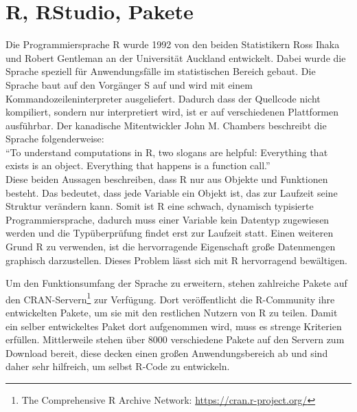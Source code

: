 \section{R, RStudio, Pakete}
\label{sec:R}
Die Programmiersprache R wurde 1992 von den beiden Statistikern  Ross Ihaka und Robert Gentleman an der Universität Auckland entwickelt. Dabei wurde die Sprache speziell für Anwendungsfälle im statistischen Bereich gebaut. Die Sprache baut auf den Vorgänger S auf und wird mit einem Kommandozeileninterpreter ausgeliefert. Dadurch dass der Quellcode nicht kompiliert, sondern nur interpretiert wird, ist er auf verschiedenen Plattformen ausführbar. Der kanadische Mitentwickler John M. Chambers beschreibt die Sprache folgenderweise:\\
\enquote{To understand computations in R, two slogans are helpful: Everything that exists is an object. Everything that happens is a function call.} \cite{chambers2014object}\\
Diese beiden Aussagen beschreiben, dass R nur aus Objekte und Funktionen besteht. Das bedeutet, dass jede Variable ein Objekt ist, das zur Laufzeit seine Struktur verändern kann. Somit ist R eine schwach, dynamisch typisierte Programmiersprache, dadurch muss einer Variable kein Datentyp zugewiesen werden und die Typüberprüfung findet erst zur Laufzeit statt. Einen weiteren Grund R zu verwenden, ist die hervorragende Eigenschaft große Datenmengen graphisch darzustellen. Dieses Problem lässt sich mit R hervorragend bewältigen.

Um den Funktionsumfang der Sprache zu erweitern, stehen zahlreiche Pakete auf den CRAN-Servern\footnote{The Comprehensive R Archive Network: \url{https://cran.r-project.org/}} zur Verfügung. Dort veröffentlicht die R-Community ihre entwickelten Pakete, um sie mit den restlichen Nutzern von R zu teilen. Damit ein selber entwickeltes Paket dort aufgenommen wird, muss es strenge Kriterien erfüllen. Mittlerweile stehen über 8000 verschiedene Pakete auf den Servern zum Download bereit, diese decken einen großen Anwendungsbereich ab und sind daher sehr hilfreich, um selbst R-Code zu entwickeln. \cite{rmanual}

